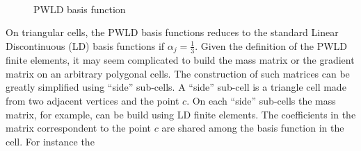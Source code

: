 \begin{figure}[H]
\centering
{}
\\
\caption{PWLD basis function}
\label{pwld}
\end{figure}
On triangular cells, the PWLD basis functions reduces to the standard Linear
Discontinuous (LD) basis functions if $\alpha_j = \frac{1}{3}$. Given the 
definition of the PWLD finite elements, it may seem complicated to build the 
mass matrix or the gradient matrix on an arbitrary polygonal cells. The 
construction of such matrices can be greatly simplified using ``side'' sub-cells. 
A ``side'' sub-cell is a triangle cell made from two adjacent vertices and the 
point $c$. On each ``side'' sub-cells the mass matrix, for example, can be build
using LD finite elements. The coefficients in the matrix correspondent to the 
point $c$ are shared among the basis function in the cell. For instance the
